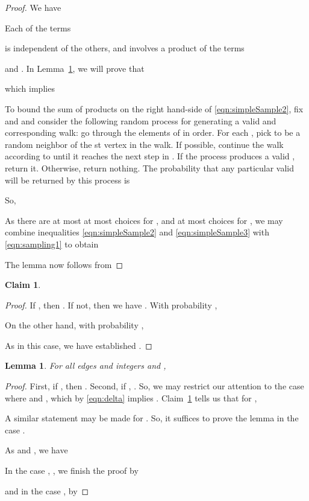 \documentclass[11pt]{article}
\newtheorem{lemma}[theorem]{Lemma}
\newtheorem{claim}[theorem]{Claim}
\begin{document}
\begin{proof}
We have



Each of the terms

is independent of the others,
  and involves a product of the terms
  
  and
  .
In Lemma~\ref{lem:edgeExpec}, we will prove that

which implies

To bound the sum of products on the right hand-side of
  \eqref{eqn:simpleSample2}, fix  and  and consider
  the following random process for generating a valid 
  and corresponding walk:
  go through the elements of  in order.
For each ,
  pick  to be a random neighbor of the st vertex in the walk.
If possible, continue the walk according to  until it reaches the next
  step in .
If the process produces a valid , return it.
Otherwise, return nothing.
The probability that any particular valid  will be returned by this
  process is

So,


As there are at most
  at most  choices for ,
  and at most  choices for ,
  we may combine inequalities \eqref{eqn:simpleSample2} and \eqref{eqn:simpleSample3} 
  with
  \eqref{eqn:sampling1} to obtain

The lemma now follows from

\end{proof}


\begin{claim}\label{clm:magnitude}

\end{claim}
\begin{proof}
If , then .
If not, then we have .
With probability ,

On the other hand, with probability ,

As  in this case, we have established
  .
\end{proof}

\begin{lemma}\label{lem:edgeExpec}
For all edges  and integers  and ,

\end{lemma}
\begin{proof}
First, if , then .
Second, if , .
So, we may restrict our attention to the case where  and ,
  which by \eqref{eqn:delta} implies .
Claim~\ref{clm:magnitude} tells us that for ,

A similar statement may be made for .
So, it suffices to prove the lemma in the case
  .


As  and
  , we have

In the case , , we finish the proof by

and in the case ,  by

\end{proof}
\end{document}

